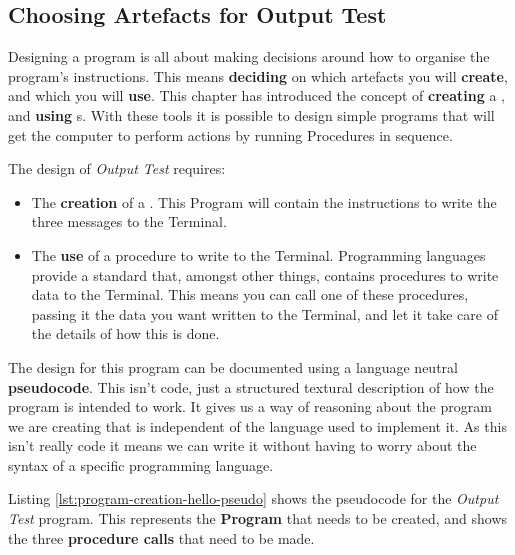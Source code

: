 \subsection{Choosing Artefacts for Output Test} %
\label{sub:choosing_artefacts_hello_world}

Designing a program is all about making decisions around how to organise the program's instructions. This means \textbf{deciding} on which artefacts you will \textbf{create}, and which you will \textbf{use}. This chapter has introduced the concept of \textbf{creating} a , and \textbf{using} s. With these tools it is possible to design simple programs that will get the computer to perform actions by running Procedures in sequence.

The design of \emph{Output Test} requires:

\begin{itemize}
  \item The \textbf{creation} of a . This Program will contain the instructions to write the three messages to the Terminal.
  \item The \textbf{use} of a procedure to write to the Terminal. Programming languages provide a standard  that, amongst other things, contains procedures to write data to the Terminal. This means you can call one of these procedures, passing it the data you want written to the Terminal, and let it take care of the details of how this is done.
\end{itemize}

\bigskip

The design for this program can be documented using a language neutral \textbf{pseudocode}. This isn't code, just a structured textural description of how the program is intended to work. It gives us a way of reasoning about the program we are creating that is independent of the language used to implement it. As this isn't really code it means we can write it without having to worry about the syntax of a specific programming language.

Listing \ref{lst:program-creation-hello-pseudo} shows the pseudocode for the \emph{Output Test} program. This represents the \textbf{Program} that needs to be created, and shows the three \textbf{procedure calls} that need to be made. 


